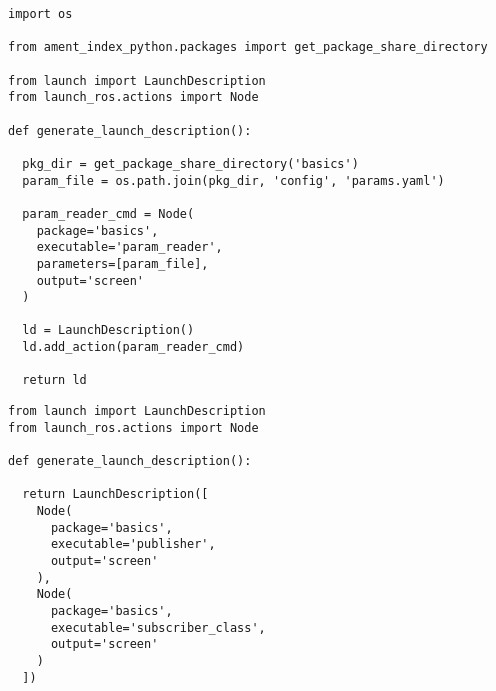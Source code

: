  \footnotesize
\begin{tcolorbox}[sharp corners, colframe=gray!80, colback=LightGray, left=0pt, top=0pt, bottom=0pt, title=\texttt{br2\_basics/launch/param\_node\_v2\_launch.py}]
  \begin{verbatim}
import os

from ament_index_python.packages import get_package_share_directory

from launch import LaunchDescription
from launch_ros.actions import Node

def generate_launch_description():

  pkg_dir = get_package_share_directory('basics')
  param_file = os.path.join(pkg_dir, 'config', 'params.yaml')

  param_reader_cmd = Node(
    package='basics',
    executable='param_reader',
    parameters=[param_file],
    output='screen'
  )

  ld = LaunchDescription()
  ld.add_action(param_reader_cmd)

  return ld
    \end{verbatim}
    \end{tcolorbox}
  \normalsize

 \footnotesize
\begin{tcolorbox}[sharp corners, colframe=gray!80, colback=LightGray, left=0pt, top=0pt, bottom=0pt, title=\texttt{br2\_basics/launch/pub\_sub\_v2\_launch.py}]
  \begin{verbatim}
from launch import LaunchDescription
from launch_ros.actions import Node

def generate_launch_description():

  return LaunchDescription([
    Node(
      package='basics',
      executable='publisher',
      output='screen'
    ),
    Node(
      package='basics',
      executable='subscriber_class',
      output='screen'
    )
  ])
    \end{verbatim}
    \end{tcolorbox}
  \normalsize

